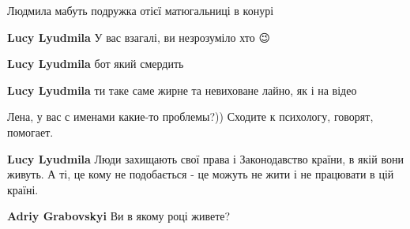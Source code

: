 \begin{itemize}
\begin{itemize}
Людмила мабуть подружка отієї матюгальниці в конурі

 
\textbf{Lucy Lyudmila}
У вас взагалі, ви незрозуміло хто 😉

 
\textbf{Lucy Lyudmila} бот який смердить

 
\textbf{Lucy Lyudmila} ти таке саме жирне та невиховане лайно, як і на відео

 
Лена, у вас с именами какие-то проблемы?)) Сходите к психологу, говорят, помогает.

 
\textbf{Lucy Lyudmila} Люди захищають свої права і Законодавство країни, в якій вони живуть. А ті, це кому не подобається - це можуть не жити і не працювати в цій країні.

 
\textbf{Adriy Grabovskyi} Ви в якому році живете?


\end{itemize}
\end{itemize}
